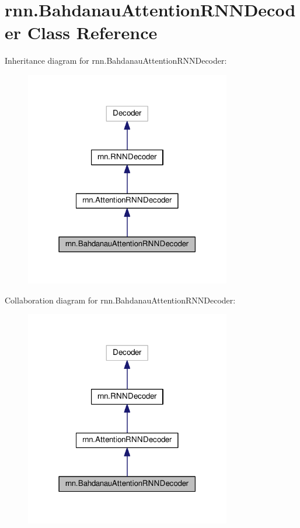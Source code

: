 \hypertarget{classrnn_1_1BahdanauAttentionRNNDecoder}{}\section{rnn.\+Bahdanau\+Attention\+R\+N\+N\+Decoder Class Reference}
\label{classrnn_1_1BahdanauAttentionRNNDecoder}


Inheritance diagram for rnn.\+Bahdanau\+Attention\+R\+N\+N\+Decoder\+:
\nopagebreak
\begin{figure}[H]
\begin{center}
\leavevmode
\includegraphics[width=255pt]{classrnn_1_1BahdanauAttentionRNNDecoder__inherit__graph}
\end{center}
\end{figure}


Collaboration diagram for rnn.\+Bahdanau\+Attention\+R\+N\+N\+Decoder\+:
\nopagebreak
\begin{figure}[H]
\begin{center}
\leavevmode
\includegraphics[width=255pt]{classrnn_1_1BahdanauAttentionRNNDecoder__coll__graph}
\end{center}
\end{figure}
